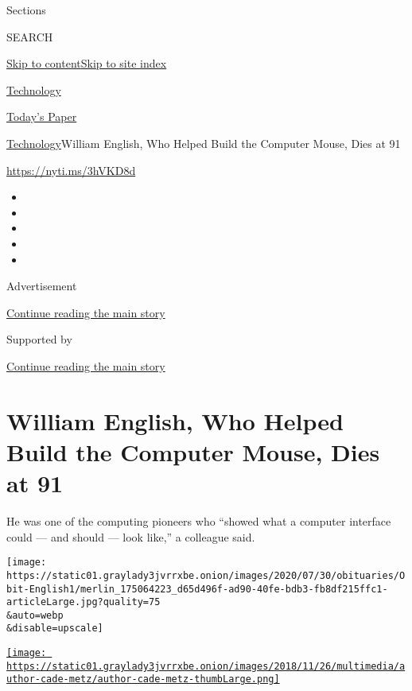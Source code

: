 Sections

SEARCH

\protect\hyperlink{site-content}{Skip to
content}\protect\hyperlink{site-index}{Skip to site index}

\href{https://www.nytimes3xbfgragh.onion/section/technology}{Technology}

\href{https://myaccount.nytimes3xbfgragh.onion/auth/login?response_type=cookie\&client_id=vi}{}

\href{https://www.nytimes3xbfgragh.onion/section/todayspaper}{Today's
Paper}

\href{/section/technology}{Technology}\textbar{}William English, Who
Helped Build the Computer Mouse, Dies at 91

\url{https://nyti.ms/3hVKD8d}

\begin{itemize}
\item
\item
\item
\item
\item
\end{itemize}

Advertisement

\protect\hyperlink{after-top}{Continue reading the main story}

Supported by

\protect\hyperlink{after-sponsor}{Continue reading the main story}

\hypertarget{william-english-who-helped-build-the-computer-mouse-dies-at-91}{%
\section{William English, Who Helped Build the Computer Mouse, Dies at
91}\label{william-english-who-helped-build-the-computer-mouse-dies-at-91}}

He was one of the computing pioneers who ``showed what a computer
interface could --- and should --- look like,'' a colleague said.

\texttt{[image: https://static01.graylady3jvrrxbe.onion/images/2020/07/30/obituaries/Obit-English1/merlin\_175064223\_d65d496f-ad90-40fe-bdb3-fb8df215ffc1-articleLarge.jpg?quality=75\\\&auto=webp\\\&disable=upscale]}

\href{https://www.nytimes3xbfgragh.onion/by/cade-metz}{\texttt{[image: https://static01.graylady3jvrrxbe.onion/images/2018/11/26/multimedia/author-cade-metz/author-cade-metz-thumbLarge.png]}}

